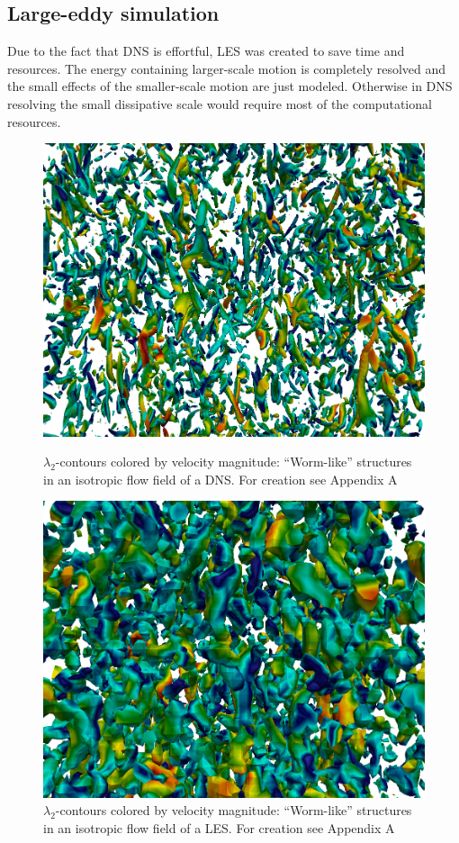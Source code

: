 \documentclass[11pt,a4paper,openany,oneside,parskip=half*]{article}
\begin{document}
\subsection{Large-eddy simulation}
Due to the fact that DNS is effortful, LES was created to save time and resources. The energy containing larger-scale motion is completely resolved and the small effects of the smaller-scale motion are just modeled. Otherwise in DNS resolving the small dissipative scale would require most of the computational resources.
\newline
\begin{figure}[h]
    \centering
    \begin{minipage}{.5\textwidth}
        \centering
        \includegraphics[width=0.95\linewidth]{./Abbildungen/256_velocity_4.png}
        \caption{$\lambda_\mathrm{2}$-contours colored by velocity magnitude: ``Worm-like'' structures in an isotropic flow field of a DNS. For creation see Appendix A}
        \label{256_velocity}
    \end{minipage}%
    \begin{minipage}{0.5\textwidth}
        \centering
        \includegraphics[width=0.95\linewidth]{./Abbildungen/64_velocity.png}
        \caption{$\lambda_\mathrm{2}$-contours colored by velocity magnitude: ``Worm-like'' structures in an isotropic flow field of a LES. For creation see Appendix A}
        \label{64_velocity}
    \end{minipage}
\end{figure}
\end{document}
